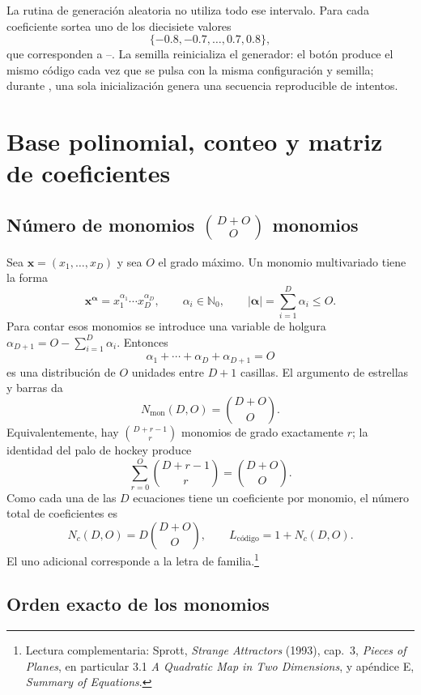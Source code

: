 La rutina de generación aleatoria no utiliza todo ese intervalo. Para cada
coeficiente sortea uno de los diecisiete valores
\[
 \{-0.8,-0.7,\ldots,0.7,0.8\},
\]
que corresponden a --. La semilla reinicializa el generador:
el botón  produce el mismo código cada vez que se pulsa con la
misma configuración y semilla; durante , una sola
inicialización genera una secuencia reproducible de intentos.

\section{Base polinomial, conteo y matriz de coeficientes}

\subsection{Número de monomios \texorpdfstring{\(\binom{D+O}{O}\)}{C(D+O,O)}
monomios}

Sea \(\mathbf{x}=(x_1,\ldots,x_D)\) y sea \(O\) el grado máximo. Un monomio
multivariado tiene la forma
\[
 \mathbf{x}^{\boldsymbol{\alpha}}
 =x_1^{\alpha_1}\cdots x_D^{\alpha_D},
 \qquad
 \alpha_i\in\mathbb{N}_0,
 \qquad
 |\boldsymbol{\alpha}|=\sum_{i=1}^{D}\alpha_i\leq O .
\]
Para contar esos monomios se introduce una variable de holgura
\(\alpha_{D+1}=O-\sum_{i=1}^{D}\alpha_i\). Entonces
\[
 \alpha_1+\cdots+\alpha_D+\alpha_{D+1}=O
\]
es una distribución de \(O\) unidades entre \(D+1\) casillas. El argumento de
estrellas y barras da
\[
 N_{\mathrm{mon}}(D,O)=\binom{D+O}{O}.
\]
Equivalentemente, hay \(\binom{D+r-1}{r}\) monomios de grado exactamente \(r\);
la identidad del palo de hockey produce
\[
 \sum_{r=0}^{O}\binom{D+r-1}{r}=\binom{D+O}{O}.
\]
Como cada una de las \(D\) ecuaciones tiene un coeficiente por monomio, el número
total de coeficientes es
\[
 N_c(D,O)=D\binom{D+O}{O},
 \qquad
 L_{\text{código}}=1+N_c(D,O).
\]
El uno adicional corresponde a la letra de familia.\footnote{Lectura
complementaria: Sprott, \emph{Strange Attractors} (1993), cap.~3,
\emph{Pieces of Planes}, en particular 3.1 \emph{A Quadratic Map in Two
Dimensions}, y apéndice E, \emph{Summary of Equations}.}

\subsection{Orden exacto de los monomios}

